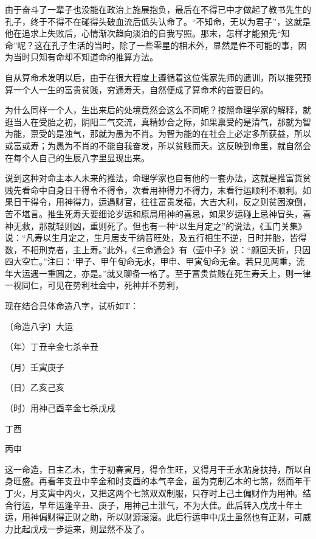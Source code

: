 \documentclass[a5paper,oneside,12pt]{ctexbook}
\begin{document}
由于奋斗了一辈子也没能在政治上施展抱负，最后在不得已中才做起了教书先生的孔子，终于不得不在碰得头破血流后低头认命了。“不知命，无以为君子”，这就是他在追求上失败后，心情渐次趋向淡泊的自我写照。那末，怎样才能预先“知命”呢？这在孔子生活的当时，除了一些零星的相术外，显然是件不可能的事，因为当时只知有命却不知道命的推算方法。

自从算命术发明以后，由于在很大程度上遵循着这位儒家先师的遗训，所以推究预算一个人一生的富贵贫贱，穷通寿夭，自然便成了算命术的首要目的。

为什么同样一个人，生出来后的处境竟然会这么不同呢？按照命理学家的解释，就逛当人在受胎之初，阴阳二气交流，真精妙合之际，如果禀受的是清气，那就为智为能，禀受的是浊气，那就为愚为不肖。为智为能的在社会上必定多所获益，所以或富或寿；为愚为不肖的不能自我奋发，所以贫贱而夭。这反映到命里，就自然会在每个人自己的生辰八字里显现出来。

说到这种对命主本人未来的推法，命理学家也自有他的一套办法，这就是推富货贫贱先看命中自身日干得令不得令，次看用神得力不得力，末看行运顺利不顺利。如果日干得令，用神得力，运遇财官，往往富贵发福，大吉大利，反之则贫困潦倒，苦不堪言。推生死寿夭要细论岁运和原局用神的喜忌，如果岁运碰上忌神冒头，喜神无救，那就轻则凶，重则死了。但也有一种“以生月定之”的说法，《玉门关集》说：“凡寿以生月定之，生月居支干纳音旺处，及五行相生不逆，日时并胎，皆得数，不相刑克者，主上寿。”此外，《三命通会》有（壶中子》说：“颜回夭折，只因四大空亡。”注曰：‘甲子、甲午旬命无水，甲申、甲寅旬命无金。若只见两重，流年大运遇一重圆之，亦是。”就又聊备一格了。至于富贵贫贱在死生寿夭上，则一律一视同仁，可见在势利社会中，死神并不势利，

现在结合具体命造八字，试析如T：

〔命造八字〕\hspace{4.4em}大运\par
（年）{\scriptsize{\qquad{}}}丁丑{\scriptsize{辛金七杀\hspace{2em}}}辛丑\par
（月）{\scriptsize{\qquad{}}}壬寅\hspace{4em}庚子\par
（日）{\scriptsize{\qquad{}}}乙亥\hspace{4em}己亥\par
（时）{\scriptsize{用神}}己酉{\scriptsize{辛金七杀\qquad{}}}戊戌\par
\hspace{9.75em}丁酉\par
\hspace{9.75em}丙申

这一命造，日主乙木，生于初春寅月，得令生旺，又得月干壬水贴身扶持，所以自身旺盛。再看年支丑中辛金和时支酉的本气辛金，虽为克制乙木的七煞，然而年干丁火，月支寅中丙火，又把这两个七煞双双制服，只存时上己土偏财作为用神。结合行运，早年运逢辛丑、庚子，用神己土泄气，不为大佳。此后转入戊戌十年土运，用神偏财得正财之助，所以财源滚滚。此后行运申中戊土虽然也有正财，可威力比起戊戌一步运来，则显然不及了。
\end{document}
